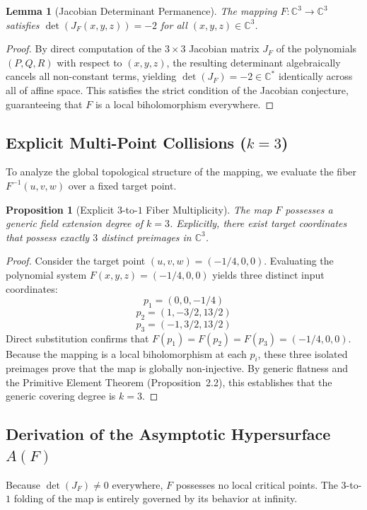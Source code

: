 \documentclass[11pt,reqno]{amsart}
\newtheorem{lemma}[theorem]{Lemma}
\newtheorem{proposition}[theorem]{Proposition}
\theoremstyle{definition}
\begin{document}
\begin{lemma}[Jacobian Determinant Permanence]
The mapping $F: \mathbb{C}^3 \to \mathbb{C}^3$ satisfies $\det(J_F(x,y,z)) = -2$ for all $(x,y,z) \in \mathbb{C}^3$.
\end{lemma}

\begin{proof}
By direct computation of the $3 \times 3$ Jacobian matrix $J_F$ of the polynomials $(P, Q, R)$ with respect to $(x, y, z)$, the resulting determinant algebraically cancels all non-constant terms, yielding $\det(J_F) = -2 \in \mathbb{C}^*$ identically across all of affine space. This satisfies the strict condition of the Jacobian conjecture, guaranteeing that $F$ is a local biholomorphism everywhere.
\end{proof}

\subsection{Explicit Multi-Point Collisions ($k = 3$)}
To analyze the global topological structure of the mapping, we evaluate the fiber $F^{-1}(u,v,w)$ over a fixed target point.

\begin{proposition}[Explicit $3$-to-$1$ Fiber Multiplicity]
The map $F$ possesses a generic field extension degree of $k = 3$. Explicitly, there exist target coordinates that possess exactly $3$ distinct preimages in $\mathbb{C}^3$.
\end{proposition}

\begin{proof}
Consider the target point $(u,v,w) = (-1/4, 0, 0)$. Evaluating the polynomial system $F(x,y,z) = (-1/4, 0, 0)$ yields three distinct input coordinates:
$$p_1 = (0, 0, -1/4)$$
$$p_2 = (1, -3/2, 13/2)$$
$$p_3 = (-1, 3/2, 13/2)$$
Direct substitution confirms that $F(p_1) = F(p_2) = F(p_3) = (-1/4, 0, 0)$. Because the mapping is a local biholomorphism at each $p_i$, these three isolated preimages prove that the map is globally non-injective. By generic flatness and the Primitive Element Theorem (Proposition~2.2), this establishes that the generic covering degree is $k = 3$.
\end{proof}

\subsection{Derivation of the Asymptotic Hypersurface $A(F)$}
Because $\det(J_F) \neq 0$ everywhere, $F$ possesses no local critical points. The $3$-to-$1$ folding of the map is entirely governed by its behavior at infinity.
\end{document}
